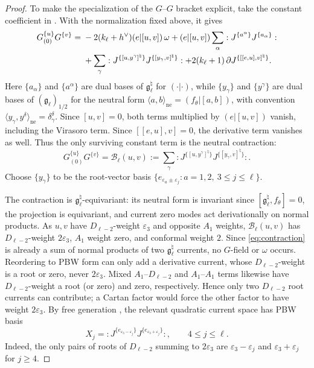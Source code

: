 \documentclass[11pt]{article}
\newcommand{\g}{\mathfrak g}
\begin{document}
\begin{proof}
To make the specialization of the $G$--$G$ bracket explicit, take the
constant coefficient in \cite[(1.1)]{AKMPPStructural}.  With the
normalization fixed above, it gives
\begin{align}
 G^{\{u\}}_{(0)}G^{\{v\}}
 ={}&-2(k_\ell+h^\vee)(e|[u,v])\,\omega
 +(e|[u,v])\sum_\alpha
 :J^{\{a^\alpha\}}J^{\{a_\alpha\}}:\notag\\
 &+\sum_\gamma
 :J^{\{[u,y^\gamma]^\natural\}}
  J^{\{[y_\gamma,v]^\natural\}}:
 +2(k_\ell+1)\,\partial
 J^{\{[[e,u],v]^\natural\}} .
 \label{eq:GG-zero-product}
\end{align}
Here $\{a_\alpha\}$ and $\{a^\alpha\}$ are dual bases of
$\g_\ell^\natural$ for $(\cdot|\cdot)$, while $\{y_\gamma\}$ and
$\{y^\gamma\}$ are dual bases of $(\g_\ell)_{1/2}$ for the neutral form
$\langle a,b\rangle_{\mathrm{ne}}=(f_\theta|[a,b])$, with convention
$\langle y_\gamma,y^\delta\rangle_{\mathrm{ne}}=\delta_\gamma^\delta$.
Since $[u,v]=0$, both terms multiplied by $(e|[u,v])$ vanish, including
the Virasoro term.  Since $[[e,u],v]=0$, the derivative term vanishes as
well.  Thus the only surviving constant term is the neutral contraction:
\begin{equation}\label{eq:contraction}
 G^{\{u\}}_{(0)}G^{\{v\}}=\mathcal B_\ell(u,v):=
 \sum_\gamma
 :J^{\{[u,y^\gamma]^\natural\}}
  J^{\{[y_\gamma,v]^\natural\}}:.
\end{equation}
Choose $\{y_\gamma\}$ to be the root-vector basis
$\{e_{\varepsilon_a\pm\varepsilon_j}:a=1,2,\ 3\le j\le\ell\}$.

The contraction is $\g_\ell^\natural$-equivariant: its neutral form is
invariant since $[\g_\ell^\natural,f_\theta]=0$, the projection is equivariant,
and current zero modes act derivationally on normal products.  As $u,v$ have $D_{\ell-2}$-weight
$\varepsilon_3$ and opposite $A_1$ weights, $\mathcal B_\ell(u,v)$ has
$D_{\ell-2}$-weight $2\varepsilon_3$, $A_1$ weight zero, and conformal weight $2$.
Since \eqref{eq:contraction} is already a sum of normal products of two
$\g_\ell^\natural$ currents, no $G$-field or $\omega$ occurs.  Reordering to
PBW form can only add a derivative current, whose $D_{\ell-2}$-weight is a root
or zero, never $2\varepsilon_3$.  Mixed $A_1$--$D_{\ell-2}$ and $A_1$--$A_1$
terms likewise have $D_{\ell-2}$-weight a root (or zero) and zero, respectively.
Hence only two $D_{\ell-2}$ root currents can contribute; a Cartan factor would
force the other factor to have weight $2\varepsilon_3$.
By free generation \cite[p.~2]{AKMPPStructural}, the relevant quadratic current
space has PBW basis
$$
 X_j=
 :J^{\{e_{\varepsilon_3-\varepsilon_j}\}}
  J^{\{e_{\varepsilon_3+\varepsilon_j}\}}:,
 \qquad 4\le j\le\ell.
$$
Indeed, the only pairs of roots of $D_{\ell-2}$ summing to
$2\varepsilon_3$ are
$\varepsilon_3-\varepsilon_j$ and $\varepsilon_3+\varepsilon_j$
for $j\ge4$.


\end{proof}
\end{document}

